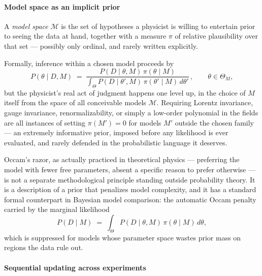 \paragraph{Model space as an implicit prior}

\begin{definition}
A \emph{model space} $\mathcal{M}$ is the set of hypotheses a physicist is
    willing to entertain prior to seeing the data at hand, together with a
    measure $\pi$ of relative plausibility over that set --- possibly only
    ordinal, and rarely written explicitly.
\end{definition}

Formally, inference within a chosen model proceeds by
\begin{equation}
P(\theta \mid D, M) \;=\; \frac{P(D \mid \theta, M)\,\pi(\theta \mid M)}
    {\displaystyle\int_{\Theta} P(D \mid \theta', M)\,\pi(\theta' \mid M)\, d\theta'}
    \,, \qquad \theta \in \Theta_M,
\end{equation}
but the physicist's real act of judgment happens one level up, in the choice of
$M$ itself from the space of all conceivable models $\mathcal{M}$. Requiring
Lorentz invariance, gauge invariance, renormalizability, or simply a low-order
polynomial in the fields are all instances of setting $\pi(M') = 0$ for models
$M'$ outside the chosen family --- an extremely informative prior, imposed
before any likelihood is ever evaluated, and rarely defended in the
probabilistic language it deserves.

\begin{remark}
Occam's razor, as actually practiced in theoretical physics --- preferring the
    model with fewer free parameters, absent a specific reason to prefer
    otherwise --- is not a separate methodological principle standing outside
    probability theory. It is a description of a prior that penalizes model
    complexity, and it has a standard formal counterpart in Bayesian model
    comparison: the automatic Occam penalty carried by the marginal likelihood
\begin{equation}
P(D \mid M) \;=\; \int_{\Theta} P(D \mid \theta, M)\,\pi(\theta \mid M)\, d\theta,
\end{equation}
which is suppressed for models whose parameter space wastes prior mass on
    regions the data rule out.
\end{remark}

\paragraph{Sequential updating across experiments}

